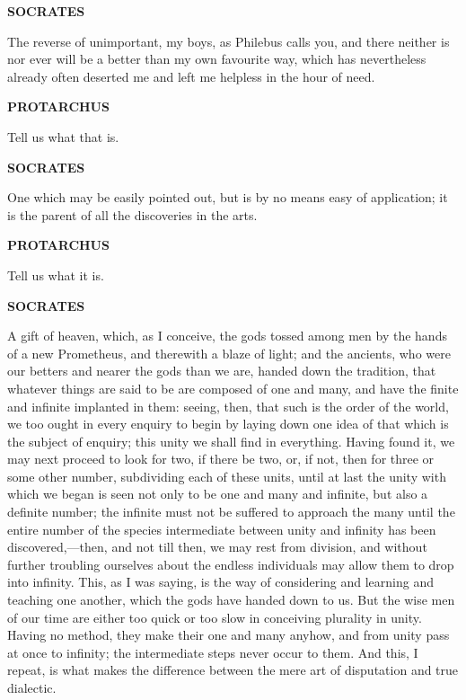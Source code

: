 \documentclass[11pt,letter]{article}
\begin{document}
\par \textbf{SOCRATES}
\par   The reverse of unimportant, my boys, as Philebus calls you, and there neither is nor ever will be a better than my own favourite way, which has nevertheless already often deserted me and left me helpless in the hour of need.

\par \textbf{PROTARCHUS}
\par   Tell us what that is.

\par \textbf{SOCRATES}
\par   One which may be easily pointed out, but is by no means easy of application; it is the parent of all the discoveries in the arts.

\par \textbf{PROTARCHUS}
\par   Tell us what it is.

\par \textbf{SOCRATES}
\par   A gift of heaven, which, as I conceive, the gods tossed among men by the hands of a new Prometheus, and therewith a blaze of light; and the ancients, who were our betters and nearer the gods than we are, handed down the tradition, that whatever things are said to be are composed of one and many, and have the finite and infinite implanted in them:  seeing, then, that such is the order of the world, we too ought in every enquiry to begin by laying down one idea of that which is the subject of enquiry; this unity we shall find in everything. Having found it, we may next proceed to look for two, if there be two, or, if not, then for three or some other number, subdividing each of these units, until at last the unity with which we began is seen not only to be one and many and infinite, but also a definite number; the infinite must not be suffered to approach the many until the entire number of the species intermediate between unity and infinity has been discovered,—then, and not till then, we may rest from division, and without further troubling ourselves about the endless individuals may allow them to drop into infinity. This, as I was saying, is the way of considering and learning and teaching one another, which the gods have handed down to us. But the wise men of our time are either too quick or too slow in conceiving plurality in unity. Having no method, they make their one and many anyhow, and from unity pass at once to infinity; the intermediate steps never occur to them. And this, I repeat, is what makes the difference between the mere art of disputation and true dialectic.
\end{document}
